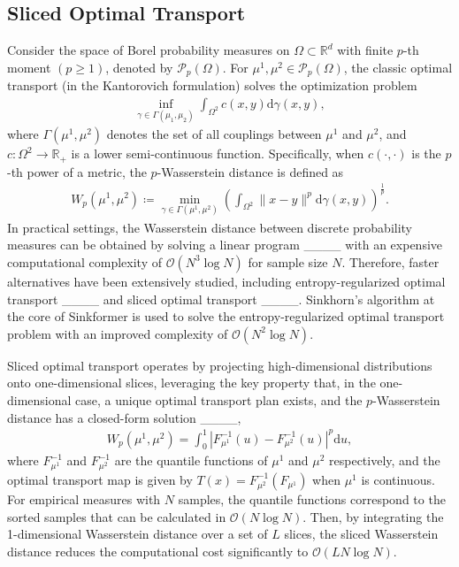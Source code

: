 \subsection{Sliced Optimal Transport}
Consider the space of Borel probability measures on $\Omega\subset\mathbb{R}^d$ with finite $p$-th moment $(p\ge 1)$, denoted by $\mathcal{P}_p(\Omega)$. For $\mu^1, \mu^2\in \mathcal{P}_p(\Omega)$, the classic optimal transport (in the Kantorovich formulation) solves the optimization problem
\begin{align}
    \inf_{\gamma\in\Gamma(\mu_1, \mu_2)}\int_{\Omega^2}c(x, y)\text{d}\gamma(x, y),
\end{align}
where $\Gamma(\mu^1, \mu^2)$ denotes the set of all couplings between $\mu^1$ and $\mu^2$, and $c:\Omega^2\rightarrow\mathbb{R}_+$ is a lower semi-continuous function. Specifically, when $c(\cdot, \cdot)$ is the $p$-th power of a metric, the $p$-Wasserstein distance is defined as
\vspace{-.1in}
\begin{align}
    W_p(\mu^1, \mu^2) \coloneqq \min_{\gamma\in\Gamma(\mu^1, \mu^2)}\left(\int_{\Omega^2}\|x-y\|^p\text{d}\gamma(x, y)\right)^{\frac{1}{p}}.
\end{align}
In practical settings, the Wasserstein distance between discrete probability measures can be obtained by solving a linear program ____ with an expensive computational complexity of $\mathcal{O}(N^3\log N)$ for sample size $N$. Therefore, faster alternatives have been extensively studied, including entropy-regularized optimal transport ____ and sliced optimal transport ____. Sinkhorn's algorithm at the core of Sinkformer is used to solve the entropy-regularized optimal transport problem with an improved complexity of $\mathcal{O}(N^2\log N)$.

Sliced optimal transport operates by projecting high-dimensional distributions onto one-dimensional slices, leveraging the key property that, in the one-dimensional case, a unique optimal transport plan exists, and the \( p \)-Wasserstein distance has a closed-form solution ____,
\begin{align}
    W_p(\mu^1, \mu^2)=\int_0^1 \left|F^{-1}_{\mu^1}(u)-F^{-1}_{\mu^2}(u)\right|^p\text{d}u,
\end{align}
where $F^{-1}_{\mu^1}$ and $F^{-1}_{\mu^2}$ are the quantile functions of $\mu^1$ and $\mu^2$ respectively, and the optimal transport map is given by $T(x)=F^{-1}_{\mu^2} (F_{\mu^1})$ when $\mu^1$ is continuous. For empirical measures with $N$ samples, the quantile functions correspond to the sorted samples that can be calculated in $\mathcal{O}(N\log N)$. Then, by integrating the 1-dimensional Wasserstein distance over a set of $L$ slices, the sliced Wasserstein distance reduces the computational cost significantly to $\mathcal{O}(LN\log N)$.

